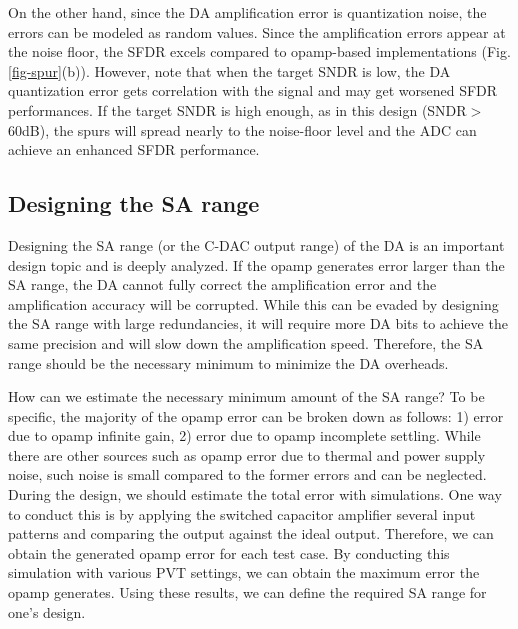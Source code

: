 On the other hand, since the DA amplification error is quantization noise, the errors can be modeled as random values. Since the amplification errors appear at the noise floor, the SFDR excels compared to opamp-based implementations (Fig.\ref{fig-spur}(b)).
However, note that when the target SNDR is low, the DA quantization error gets correlation with the signal and may get worsened SFDR performances. If the target SNDR is high enough, as in this design (SNDR$>$60dB), the spurs will spread nearly to the noise-floor level and the ADC can achieve an enhanced SFDR performance. 
\subsection{Designing the SA range}
Designing the SA range (or the C-DAC output range) of the DA is an important design topic and is deeply analyzed.
If the opamp generates error larger than the SA range, the DA cannot fully correct the amplification error and the amplification accuracy will be corrupted.
While this can be evaded by designing the SA range with large redundancies, it will require more DA bits to achieve the same precision and will slow down the amplification speed.
Therefore, the SA range should be the necessary minimum to minimize the DA overheads. 

How can we estimate the necessary minimum amount of the SA range?
To be specific, the majority of the opamp error can be broken down as follows: 1) error due to opamp infinite gain, 2) error due to opamp incomplete settling.
While there are other sources such as opamp error due to thermal and power supply noise, such noise is small compared to the former errors and can be neglected.
During the design, we should estimate the total error with simulations. One way to conduct this is by applying the switched capacitor amplifier several input patterns and comparing the output against the ideal output. Therefore, we can obtain the generated opamp error for each test case. By conducting this simulation with various PVT settings, we can obtain the maximum error the opamp generates.
Using these results, we can define the required SA range for one's design.

